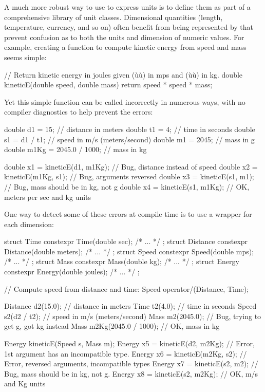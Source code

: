A much more robust way to use  to express units is to
define them as part of a comprehensive library of unit classes.
Dimensional quantities (length, temperature, currency, and so on) often
benefit from being represented by  that
prevent confusion as to both the units and dimension of numeric values.
For example, creating a function to compute kinetic energy from speed
and mass seems simple:

\begin{emcppslisting}[emcppsbatch=e20]
// Return kinetic energy in joules given (ù{}ù) in mps and (ù{}ù) in kg.
double kineticE(double speed, double mass)
{
    return speed * speed * mass;
}
\end{emcppslisting}
    
\noindent Yet this simple function can be called incorrectly in numerous ways,
with no compiler diagnostics to help prevent the errors:

\begin{emcppslisting}[emcppsbatch=e20]
double d1   = 15;             // distance in meters
double t1   = 4;              // time in seconds
double s1   = d1 / t1;        // speed in m/s (meters/second)
double m1   = 2045;           // mass in g
double m1Kg = 2045.0 / 1000;  // mass in kg

double x1 = kineticE(d1, m1Kg);  // Bug, distance instead of speed
double x2 = kineticE(m1Kg, s1);  // Bug, arguments reversed
double x3 = kineticE(s1, m1);    // Bug, mass should be in kg, not g
double x4 = kineticE(s1, m1Kg);  // OK, meters per sec and kg units
\end{emcppslisting}
    
\noindent One way to detect some of these errors at compile time is to use a
wrapper for each dimension:

\begin{emcppslisting}[emcppsbatch=e20]
struct Time     { constexpr Time(double sec);        /* ... */ };
struct Distance { constexpr Distance(double meters); /* ... */ };
struct Speed    { constexpr Speed(double mps);       /* ... */ };
struct Mass     { constexpr Mass(double kg);         /* ... */ };
struct Energy   { constexpr Energy(double joules);   /* ... */ };

// Compute speed from distance and time:
Speed operator/(Distance, Time);

Distance d2(15.0);             // distance in meters
Time     t2(4.0);              // time in seconds
Speed    s2(d2 / t2);          // speed in m/s (meters/second)
Mass     m2(2045.0);           // Bug, trying to get g, got kg instead
Mass     m2Kg(2045.0 / 1000);  // OK, mass in kg

Energy kineticE(Speed s, Mass m);
Energy x5 = kineticE(d2, m2Kg); // Error, 1st argument has an incompatible type.
Energy x6 = kineticE(m2Kg, s2); // Error, reversed arguments, incompatible types
Energy x7 = kineticE(s2, m2);   // Bug, mass should be in kg, not g.
Energy x8 = kineticE(s2, m2Kg); // OK, m/s and Kg units
\end{emcppslisting}
    
